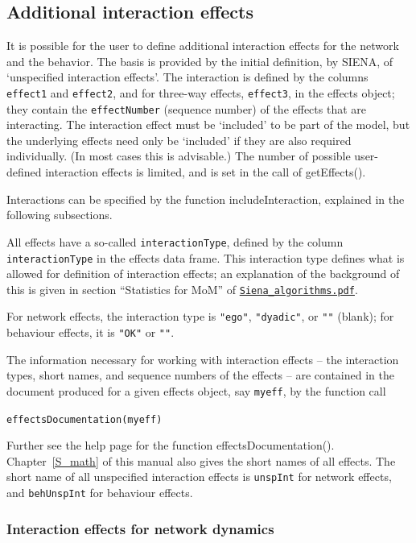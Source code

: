 \documentclass[a4paper,fleqn,11pt]{article}
\newcommand{\+}{\, + \,}
\newcommand{\sfn}[1]{\textsf{#1}}
\newcommand{\si}{{\sf SIENA}}
\begin{document}
\hypertarget{T_int_eff}{
\subsection{Additional interaction effects}
}
\label{S_int_eff}

It is possible for the user to define additional interaction effects for the
network and the behavior.
The basis is provided by the initial definition, by \si, of `unspecified
interaction effects'.
The interaction is defined by
the columns \texttt{effect1} and \texttt{effect2},
and for three-way effects, \texttt{effect3},
in the effects object; they contain the \texttt{effectNumber}
(sequence number) of the effects that are interacting.
The interaction effect must be `included' to be part of the model,
but the underlying effects need only be `included' if
they are also required individually.
(In most cases this is advisable.)
The number of possible user-defined interaction effects is limited,
and is set in the call of \sfn{getEffects()}.

Interactions can be specified by the function \sfn{includeInteraction},
explained in the following subsections.

All effects have a so-called  \texttt{interactionType},
defined by the column \texttt{interactionType} in the effects data frame.
This interaction type defines what is allowed for  definition of interaction effects;
an explanation of the background of this
is given in section ``Statistics for MoM'' of
\href{http://www.stats.ox.ac.uk/~snijders/siena/Siena_algorithms.pdf}{\texttt{Siena\_algorithms.pdf}}.

For network effects, the interaction type is \texttt{"ego"}, \texttt{"dyadic"}, or \texttt{""} (blank);
for behaviour effects, it is \texttt{"OK"} or \texttt{""}.

The information necessary for working with interaction effects
-- the interaction types, short names, and sequence numbers
of the effects -- are contained in the document produced
for a given effects object, say \texttt{myeff}, by the function call

\verb|effectsDocumentation(myeff)|

\noindent
Further see the help page for the function \sfn{effectsDocumentation()}.
Chapter~\ref{S_math} of this manual also gives the short names of all effects.
The short name of all unspecified interaction effects is \texttt{unspInt}
for network effects, and \texttt{behUnspInt} for behaviour effects.


\subsubsection{Interaction effects for network dynamics}
\end{document}
